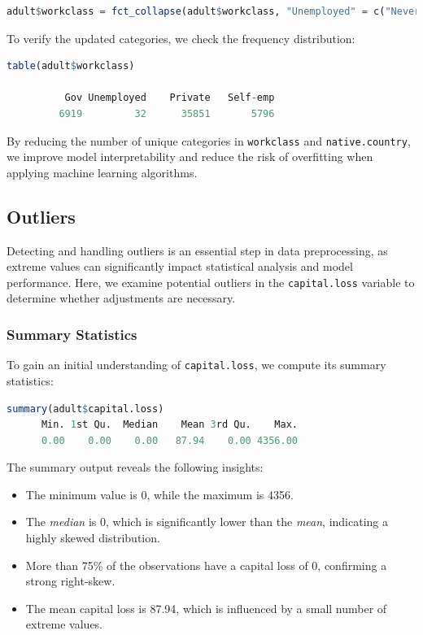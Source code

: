 \documentclass[
  11pt,
]{book}
\newcommand{\passthrough}[1]{#1}
\providecommand{\tightlist}{%
  \setlength{\itemsep}{0pt}\setlength{\parskip}{0pt}}
\theoremstyle{definition}
\theoremstyle{definition}
\theoremstyle{definition}
\theoremstyle{definition}
\theoremstyle{remark}
\begin{document}
\begin{lstlisting}[language=R]
adult$workclass = fct_collapse(adult$workclass, "Unemployed" = c("Never-worked", "Without-pay"))
\end{lstlisting}

To verify the updated categories, we check the frequency distribution:

\begin{lstlisting}[language=R]
table(adult$workclass)
   
          Gov Unemployed    Private   Self-emp 
         6919         32      35851       5796
\end{lstlisting}

By reducing the number of unique categories in \passthrough{\lstinline!workclass!} and \passthrough{\lstinline!native.country!}, we improve model interpretability and reduce the risk of overfitting when applying machine learning algorithms.

\subsection{Outliers}\label{outliers}

Detecting and handling outliers is an essential step in data preprocessing, as extreme values can significantly impact statistical analysis and model performance. Here, we examine potential outliers in the \passthrough{\lstinline!capital.loss!} variable to determine whether adjustments are necessary.

\subsubsection*{Summary Statistics}\label{summary-statistics}


To gain an initial understanding of \passthrough{\lstinline!capital.loss!}, we compute its summary statistics:

\begin{lstlisting}[language=R]
summary(adult$capital.loss)
      Min. 1st Qu.  Median    Mean 3rd Qu.    Max. 
      0.00    0.00    0.00   87.94    0.00 4356.00
\end{lstlisting}

The summary output reveals the following insights:

\begin{itemize}
\tightlist
\item
  The minimum value is 0, while the maximum is 4356.\\
\item
  The \emph{median} is 0, which is significantly lower than the \emph{mean}, indicating a highly skewed distribution.\\
\item
  More than 75\% of the observations have a capital loss of 0, confirming a strong right-skew.\\
\item
  The mean capital loss is 87.94, which is influenced by a small number of extreme values.
\end{itemize}
\end{document}
